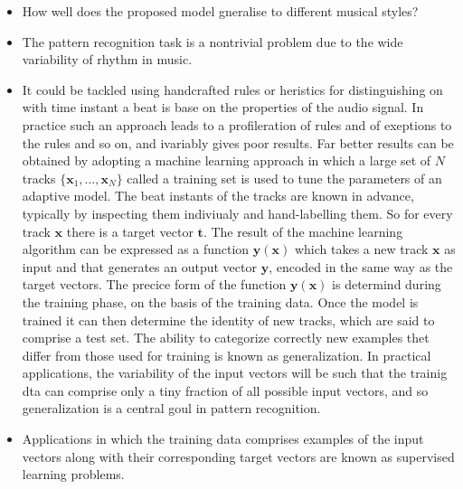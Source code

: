\documentclass{scrartcl}
\begin{document}
\begin{itemize}
\item How well does the proposed model gneralise to different musical styles?
\item The pattern recognition task is a nontrivial problem due to the wide variability of rhythm in music. 
\item It could be tackled using handcrafted rules or heristics for distinguishing on with time instant a beat is base on the properties of the audio signal. In practice such an approach leads to a profileration of rules and of exeptions to the rules and so on, and ivariably gives poor results. Far better results can be obtained by adopting a machine learning approach in which a large set of $N$ tracks $\{\mathbf x_1, \dots, \mathbf x_N\}$ called a training set is used to tune the parameters of an adaptive model. The beat instants of the tracks are known in advance, typically by inspecting them indiviualy and hand-labelling them. So for every track $\mathbf x$ there is a target vector $\mathbf t$. The result of the machine learning algorithm can be expressed as a function $\mathbf y(\mathbf x)$ which takes a new track $\mathbf x$ as input and that generates an output vector $\mathbf y$, encoded in the same way as the target vectors. The precice form of the function $\mathbf y(\mathbf x)$ is determind during the training phase, on the basis of the training data. Once the model is trained it can then determine the identity of new tracks, which are said to comprise a test set. The ability to categorize correctly new examples thet differ from those used for training is known as generalization. In practical applications, the variability of the input vectors will be such that the trainig dta can comprise only a tiny fraction of all possible input vectors, and so generalization is a central goul in pattern recognition. 
\item Applications in which the training data comprises examples of the input vectors along with their corresponding target vectors are known as supervised learning problems. 
\end{itemize}
\end{document}
